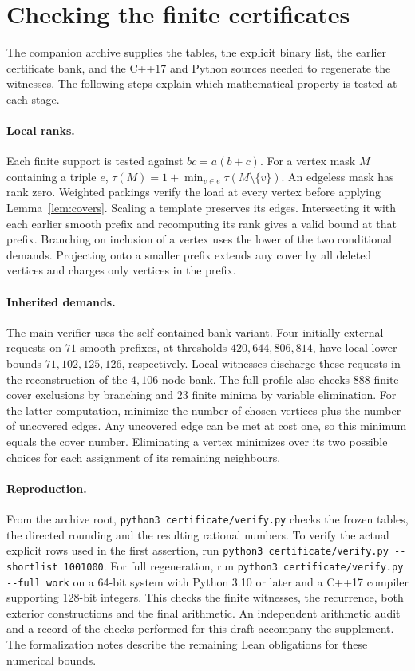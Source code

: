 \documentclass[11pt,letterpaper]{article}
\theoremstyle{definition}
\begin{document}
\section{Checking the finite certificates}\label{sec:verification}
The companion archive supplies the tables, the explicit binary list,
the earlier certificate bank, and the C++17 and Python sources needed
to regenerate the witnesses. The following steps explain which
mathematical property is tested at each stage.

\paragraph{Local ranks.}
Each finite support is tested against $bc=a(b+c)$. For a vertex mask
$M$ containing a triple $e$,
$\tau(M)=1+\min_{v\in e}\tau(M\setminus\{v\})$. An edgeless mask has
rank zero. Weighted packings verify the load at every vertex before
applying Lemma~\ref{lem:covers}. Scaling a template preserves its
edges. Intersecting it with each earlier smooth prefix and recomputing
its rank gives a valid bound at that prefix. Branching on inclusion
of a vertex uses the lower of the two conditional demands. Projecting
onto a smaller prefix extends any cover by all deleted vertices and
charges only vertices in the prefix.

\paragraph{Inherited demands.}
The main verifier uses the self-contained bank variant. Four initially
external requests on $71$-smooth prefixes, at thresholds $420,644,806,814$,
have local lower bounds $71,102,125,126$, respectively. Local witnesses
discharge these requests in the reconstruction of the $4{,}106$-node
bank. The full profile also checks $888$ finite cover exclusions by
branching and $23$ finite minima by variable elimination. For the
latter computation, minimize the number of chosen vertices plus the
number of uncovered edges. Any uncovered edge can be met at cost one,
so this minimum equals the cover number. Eliminating a vertex minimizes
over its two possible choices for each assignment of its remaining
neighbours.

\paragraph{Reproduction.}
From the archive root, \texttt{python3 certificate/verify.py} checks the
frozen tables, the directed rounding and the resulting rational numbers.
To verify the actual explicit rows used in the first assertion, run
\verb|python3 certificate/verify.py --shortlist 1001000|.
For full regeneration, run \verb|python3 certificate/verify.py --full work|
on a 64-bit system with Python 3.10 or later and a C++17 compiler
supporting 128-bit integers. This checks the finite witnesses, the
recurrence, both exterior constructions and the final arithmetic.
An independent arithmetic audit and a record of the checks performed
for this draft accompany the supplement. The formalization notes
describe the remaining Lean obligations for these numerical bounds.
\end{document}

